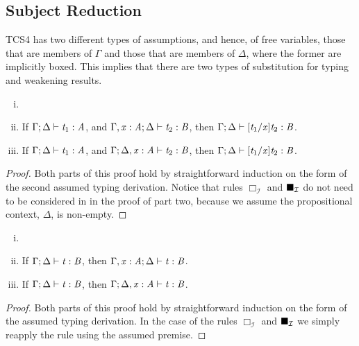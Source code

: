 \subsection{Subject Reduction}
\label{subsec:subject_reduction}
TCS4 has two different types of assumptions, and hence, of
free variables, those that are members of $\Gamma$ and those that are
members of $\Delta$, where the former are implicitly boxed.  This
implies that there are two types of substitution for typing and
weakening results.
\begin{lemma}
  \label{lemma:substitution_for_typing}
  \begin{enumerate}[i.]
  \item[] 
  \item If $\Gamma  ;  \Delta  \vdash  \mathit{t_{{\mathrm{1}}}}  :  \mathit{A}$, and $\Gamma  ,  \mathit{x}  :  \mathit{A}  ;  \Delta  \vdash  \mathit{t_{{\mathrm{2}}}}  :  \mathit{B}$, then $\Gamma  ;  \Delta  \vdash  [  \mathit{t_{{\mathrm{1}}}}  /  \mathit{x}  ]  \mathit{t_{{\mathrm{2}}}}  :  \mathit{B}$.
  \item If $\Gamma  ;  \Delta  \vdash  \mathit{t_{{\mathrm{1}}}}  :  \mathit{A}$, and $\Gamma  ;  \Delta  ,  \mathit{x}  :  \mathit{A}  \vdash  \mathit{t_{{\mathrm{2}}}}  :  \mathit{B}$, then $\Gamma  ;  \Delta  \vdash  [  \mathit{t_{{\mathrm{1}}}}  /  \mathit{x}  ]  \mathit{t_{{\mathrm{2}}}}  :  \mathit{B}$.
  \end{enumerate}
\end{lemma}
\begin{proof}
  Both parts of this proof hold by straightforward induction on the
  form of the second assumed typing derivation.  Notice that rules
  $\Box_{\mathcal{I}}$ and $\blacksquare_{\mathcal{I}}$ do not need to be
  considered in in the proof of part two, because we assume the
  propositional context, $\Delta$, is non-empty.
\end{proof}

\begin{lemma}[Weakening]
  \label{lemma:weakening}
  \begin{enumerate}[i.]
  \item[]
  \item If $\Gamma  ;  \Delta  \vdash  \mathit{t}  :  \mathit{B}$, then $\Gamma  ,  \mathit{x}  :  \mathit{A}  ;  \Delta  \vdash  \mathit{t}  :  \mathit{B}$.
  \item If $\Gamma  ;  \Delta  \vdash  \mathit{t}  :  \mathit{B}$, then $\Gamma  ;  \Delta  ,  \mathit{x}  :  \mathit{A}  \vdash  \mathit{t}  :  \mathit{B}$.
  \end{enumerate}
\end{lemma}
\begin{proof}
  Both parts of this proof hold by straightforward induction on the
  form of the assumed typing derivation.  In the case of the rules
  $\Box_{\mathcal{I}}$ and $\blacksquare_{\mathcal{I}}$ we simply reapply the
  rule using the assumed premise.
\end{proof}


